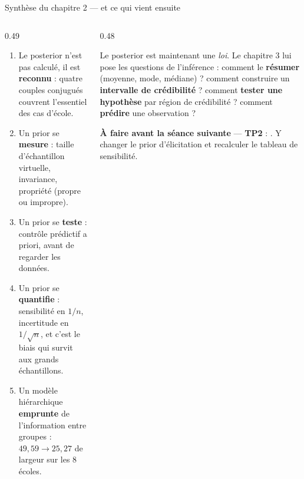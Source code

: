 \begin{frame}{Synthèse du chapitre 2 — et ce qui vient ensuite}
\begin{columns}[t]
\begin{column}{0.49\textwidth}
\begin{kbox}
\begin{enumerate}
  \item Le posterior n'est pas calculé, il est \textbf{reconnu} : quatre couples
        conjugués couvrent l'essentiel des cas d'école.
  \item Un prior se \textbf{mesure} : taille d'échantillon virtuelle, invariance,
        propriété (propre ou impropre).
  \item Un prior se \textbf{teste} : contrôle prédictif a priori, avant de
        regarder les données.
  \item Un prior se \textbf{quantifie} : sensibilité en $1/n$, incertitude en
        $1/\sqrt{n}$, et c'est le biais qui survit aux grands échantillons.
  \item Un modèle hiérarchique \textbf{emprunte} de l'information entre groupes :
        $49{,}59 \to 25{,}27$ de largeur sur les 8 écoles.
\end{enumerate}
\end{kbox}
\end{column}
\begin{column}{0.48\textwidth}
\begin{ebox}
Le posterior est maintenant une \emph{loi}. Le chapitre 3 lui pose les questions de
l'inférence : comment le \textbf{résumer} (moyenne, mode, médiane) ? comment
construire un \textbf{intervalle de crédibilité} ? comment \textbf{tester une
hypothèse} par région de crédibilité ? comment \textbf{prédire} une observation ?
\end{ebox}
\begin{tcolorbox}[colback=byCyan!8,colframe=byCyan,arc=2mm]
\small\centering
\textbf{À faire avant la séance suivante} — \textbf{TP2} :
. Y changer
le prior d'élicitation et recalculer le tableau de sensibilité.
\end{tcolorbox}
\end{column}
\end{columns}
\end{frame}
